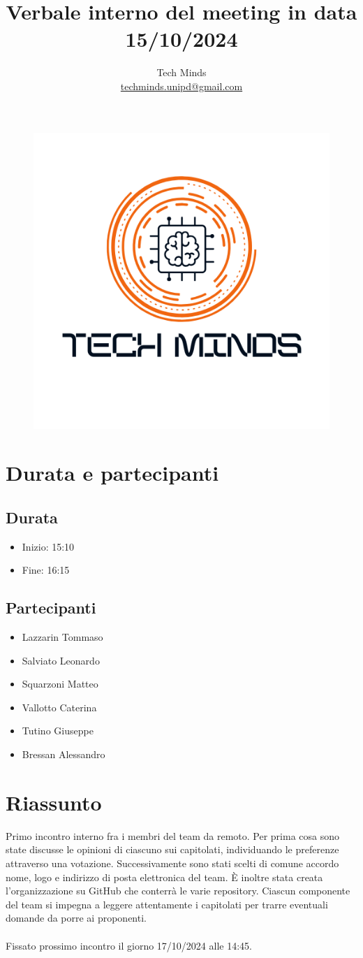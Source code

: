 \documentclass[10pt]{article}
\title{Verbale interno del meeting in data 15/10/2024}
\author{Tech Minds \\ \href{mailto:techminds.unipd@gmail.com}{techminds.unipd@gmail.com}}
\date{}
\begin{document}
\maketitle

\begin{figure}[h]
    \centering
    \includegraphics[width=0.3\linewidth]{../../../../assets/logo.png}
\end{figure}

\tableofcontents{\newpage}

\section{Durata e partecipanti}
\subsection{Durata}
\begin{itemize}
  \item Inizio: 15:10
  \item Fine: 16:15
\end{itemize}
\subsection{Partecipanti}
\begin{itemize}
  \item Lazzarin Tommaso
  \item Salviato Leonardo
  \item Squarzoni Matteo
  \item Vallotto Caterina
  \item Tutino Giuseppe
  \item Bressan Alessandro
\end{itemize}

\section{Riassunto}
Primo incontro interno fra i membri del team da remoto.
Per prima cosa sono state discusse le opinioni di ciascuno sui capitolati, individuando le preferenze attraverso una votazione.
Successivamente sono stati scelti di comune accordo nome, logo e indirizzo di posta elettronica del team.
È inoltre stata creata l'organizzazione su GitHub che conterrà le varie repository.
Ciascun componente del team si impegna a leggere attentamente i capitolati per trarre eventuali domande da porre ai proponenti. \\\\
Fissato prossimo incontro il giorno 17/10/2024 alle 14:45.
\end{document}
